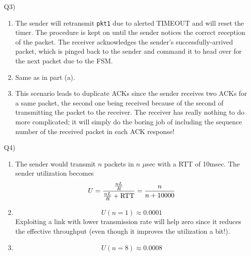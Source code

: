 \documentclass[10pt,letterpaper]{article}
\newcommand{\wid}{0.49\textwidth}
\begin{document}
Q3)

\begin{enumerate}[label=\alph*-]
\item
The sender will retransmit \texttt{pkt1} due to alerted TIMEOUT and will reset the timer. The procedure is kept on until the sender notices the correct reception of the packet. The receiver acknowledges the sender's successfully-arrived packet, which is pinged back to the sender and command it to head over for the next packet due to the FSM.
\item
Same as in part (a).
\item
This scenario leads to duplicate ACKs since the sender receives two ACKs for a same packet, the second one being received because of the second of transmitting the packet to the receiver. The receiver has really nothing to do more complicated; it will simply do the boring job of including the sequence number of the received packet in each ACK response!
\end{enumerate}

Q4)


\begin{enumerate}[label=\alph*-]
\item
The sender would transmit $n$ packets in $n$ $\mu$sec with a RTT of 10msec. The sender utilization becomes
$$
U={{nL\over R}\over {nL\over R}+\text{RTT}}={n\over n+10000}
$$
\item
$$
U(n=1)\approx 0.0001
$$
Exploiting a link with lower transmission rate will help zero since it reduces the effective throughput (even though it improves the utilization a bit!).
\item
$$
U(n=8)\approx0.0008
$$
\end{enumerate}
%
\end{document}
